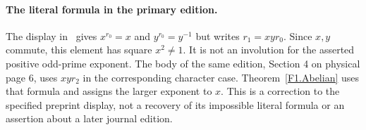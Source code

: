 \paragraph{The literal formula in the primary edition.}
The display in~\cite[Theorem 1.2, physical p.\ 2]{HFLQ} gives
$x^{r_0}=x$ and $y^{r_0}=y^{-1}$ but writes $r_1=xy r_0$.
Since $x,y$ commute, this element has square $x^2\ne1$.
It is not an involution for the asserted positive odd-prime exponent.
The body of the same edition, Section 4 on physical page 6, uses
$xy r_2$ in the corresponding character case. Theorem~\ref{F1.Abelian}
uses that formula and assigns the larger exponent to $x$.
This is a correction to the specified preprint display, not a recovery
of its impossible literal formula or an assertion about a later
journal edition.
